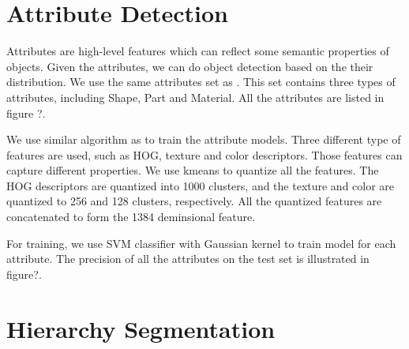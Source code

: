 \documentclass[10pt,twocolumn,letterpaper]{article}
\begin{document}
\section{Attribute Detection}
\label{sec:attribute}

Attributes are high-level features which can reflect some semantic properties of objects. Given the attributes, we can do object detection based on the their distribution. We use the same attributes set as \cite{farhadi09}. This set contains three types of attributes, including Shape, Part and Material. All the attributes are listed in figure ?.

We use similar algorithm as \cite{farhadi09} to train the attribute models. Three different type of features are used, such as HOG, texture and color descriptors\cite{farhadi09}. Those features can capture different properties. We use kmeans to quantize all the features. The HOG descriptors are quantized into 1000 clusters, and the texture and color are quantized to 256 and 128 clusters, respectively. All the quantized features are concatenated to form the 1384 deminsional feature. 

For training, we use SVM classifier with Gaussian kernel to train model for each attribute. The precision of all the attributes on the test set is illustrated in figure?.



\section{Hierarchy Segmentation}
\label{sec:segmentation}
\end{document}
